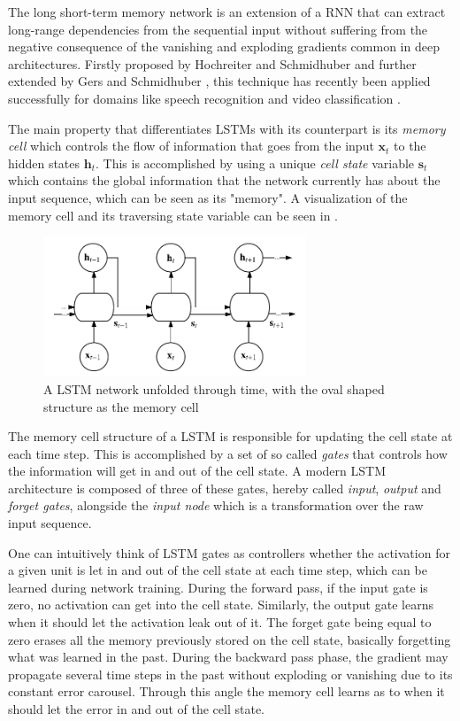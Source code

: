\documentclass{kththesis}
\begin{document}
The long short-term memory network is an extension of a RNN that can extract long-range dependencies from the sequential input without suffering from the negative consequence of the vanishing and exploding gradients common in deep architectures. Firstly proposed by Hochreiter and Schmidhuber \citep{hochreiter1997long} and further extended by Gers and Schmidhuber \citep{gers1999learning}, this technique has recently been applied successfully for domains like speech recognition \citep{graves2013speech} and video classification \citep{yue2015beyond}.

The main property that differentiates LSTMs with its counterpart is its \emph{memory cell} which controls the flow of information that goes from the input $\mathbf{x}_t$ to the hidden states $\mathbf{h}_t$. This is accomplished by using a unique \emph{cell state} variable $\mathbf{s}_t$ which contains the global information that the network currently has about the input sequence, which can be seen as its "memory". A visualization of the memory cell and its traversing state variable can be seen in .

\begin{figure}[h]
    \centering
    \includegraphics[width=0.7\textwidth,keepaspectratio]{figures/lstm.pdf}
    \caption{A LSTM network unfolded through time, with the oval shaped structure as the memory cell}
    \label{fig:lstm}
\end{figure}

The memory cell structure of a LSTM is responsible for updating the cell state at each time step. This is accomplished by a set of so called \emph{gates} that controls how the information will get in and out of the cell state. A modern LSTM architecture is composed of three of these gates, hereby called \emph{input}, \emph{output} and \emph{forget gates}, alongside the \emph{input node} which is a transformation over the raw input sequence. 

One can intuitively think of LSTM gates as controllers whether the activation for a given unit is let in and out of the cell state at each time step, which can be learned during network training. During the forward pass, if the input gate is zero, no activation can get into the cell state. Similarly, the output gate learns when it should let the activation leak out of it. The forget gate being equal to zero erases all the memory previously stored on the cell state, basically forgetting what was learned in the past. During the backward pass phase, the gradient may propagate several time steps in the past without exploding or vanishing due to its constant error carousel. Through this angle the memory cell learns as to when it should let the error in and out of the cell state.
\end{document}
